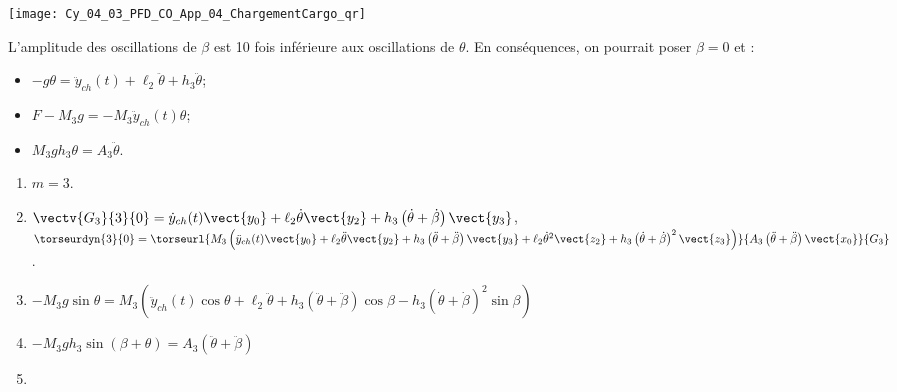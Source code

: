 \fi


\ifprof
\else
\begin{marginfigure}
\centering
\texttt{[image: Cy\_04\_03\_PFD\_CO\_App\_04\_ChargementCargo\_qr]}
\end{marginfigure}
\fi

\ifprof
\begin{corrige}
L'amplitude des oscillations de $\beta$ est 10 fois inférieure aux oscillations de $\theta$. En conséquences, on pourrait poser $\beta=0$ et :

\begin{itemize}
\item $ - g \theta  = \ddot{y}_{ch}(t) +\ell_2\ddot{\theta} +h_3\ddot{\theta} $;
\item  $F-M_3 g  = - M_3 \ddot{y}_{ch}(t) \theta  $;
\item  $M_3gh_3 \theta =A_3 \ddot{\theta} $.
\end{itemize}

\end{corrige}
\else
\fi

\ifprof
\else
\ifcolle
\else
\begin{solution}
\begin{enumerate}
\item $m=3$.
\item $\vectv{G_3}{3}{0}=   
\dot{y}_{ch}(t) \vect{y_0}+\ell_2\dot{\theta} \vect{y_2}+h_3\left(\dot{\theta}+\dot{\beta}\right) \vect{y_3}$, 
$\torseurdyn{3}{0}=\torseurl{M_3\left(\ddot{y}_{ch}(t) \vect{y_0}+\ell_2\ddot{\theta} \vect{y_2}+h_3\left(\ddot{\theta}+\ddot{\beta}\right) \vect{y_3}
+   
\ell_2\dot{\theta}^2 \vect{z_2}  +h_3\left(\dot{\theta}+\dot{\beta}\right)^2\vect{z_3}\right)}{A_3 \left(\ddot{\theta}+\ddot{\beta} \right)\vect{x_0}}{G_3}$.
\item $ -M_3 g \sin \theta  = 
 M_3\left(\ddot{y}_{ch}(t) \cos \theta +\ell_2\ddot{\theta} +h_3\left(\ddot{\theta}+\ddot{\beta}\right)\cos \beta 
-h_3\left(\dot{\theta}+\dot{\beta}\right)^2\sin\beta \right)$
\item $- M_3gh_3 \sin\left( \beta + \theta\right) =A_3 \left(\ddot{\theta}+\ddot{\beta} \right)$
\item 
\end{enumerate}
\end{solution}
\fi
\fi


